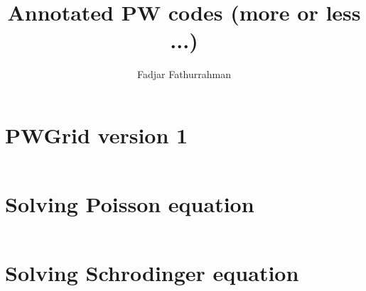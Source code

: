 \documentclass[a4paper,10pt]{extarticle}
\begin{document}
\title{Annotated PW codes (more or less ...)}
\author{Fadjar Fathurrahman}
\date{}
\maketitle

\section{PWGrid version 1}

\begin{mdframed}[backgroundcolor=mintedbg]
\inputminted[breaklines]{julia}{../common/PWGrid_v01.jl}
\end{mdframed}

\section{Solving Poisson equation}

\begin{mdframed}[backgroundcolor=mintedbg]
\inputminted[breaklines]{julia}{../poisson_01/main.jl}
\end{mdframed}


\section{Solving Schrodinger equation}
\end{document}
